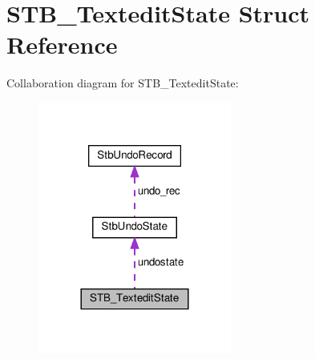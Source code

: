 \hypertarget{structSTB__TexteditState}{}\section{S\+T\+B\+\_\+\+Textedit\+State Struct Reference}
\label{structSTB__TexteditState}


Collaboration diagram for S\+T\+B\+\_\+\+Textedit\+State\+:\nopagebreak
\begin{figure}[H]
\begin{center}
\leavevmode
\includegraphics[width=180pt]{structSTB__TexteditState__coll__graph}
\end{center}
\end{figure}
